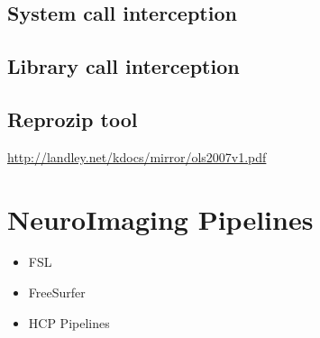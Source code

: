 \subsection{System call interception}
\subsection{Library call interception}
\subsection{Reprozip tool}
\hyperref[System Call Interception]{http://landley.net/kdocs/mirror/ols2007v1.pdf}

\section{NeuroImaging Pipelines}
\begin{itemize}
 \item FSL
 \item FreeSurfer
 \item HCP Pipelines
\end{itemize}


